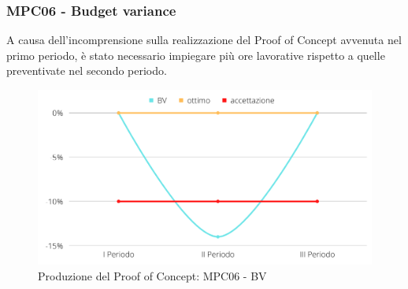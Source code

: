 \subsubsection{MPC06 - Budget variance}
A causa dell'incomprensione sulla realizzazione del Proof of Concept avvenuta nel primo periodo, è stato necessario impiegare più ore lavorative rispetto a quelle preventivate nel secondo periodo.
\begin{figure}[H]
    \centering
    \includegraphics[scale=0.50]{Sezioni/images/poc-BV.png}
    \caption{Produzione del Proof of Concept: MPC06 - BV}
\end{figure}

